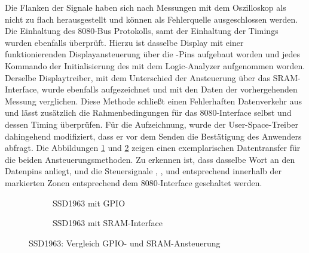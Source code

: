 Die Flanken der Signale haben sich nach Messungen mit dem Oszilloskop als nicht zu flach herausgestellt und können als Fehlerquelle ausgeschlossen werden. Die Einhaltung des 8080-Bus Protokolls, samt der Einhaltung der Timings wurden ebenfalls überprüft. Hierzu ist dasselbe Display mit einer funktionierenden Displayansteuerung über die -Pins aufgebaut worden und jedes Kommando der Initialisierung des  mit dem Logic-Analyzer aufgenommen worden. Derselbe Displaytreiber, mit dem Unterschied der Ansteuerung über das SRAM-Interface, wurde ebenfalls aufgezeichnet und mit den Daten der vorhergehenden Messung verglichen. Diese Methode schließt einen Fehlerhaften Datenverkehr aus und lässt zusätzlich die Rahmenbedingungen für das 8080-Interface selbst und dessen Timing überprüfen. Für die Aufzeichnung, wurde der User-Space-Treiber dahingehend modifiziert, dass er vor dem Senden die Bestätigung des Anwenders abfragt. Die Abbildungen \ref{fig:ssd1963_gpio} und \ref{fig:ssd1963_sram} zeigen einen exemplarischen Datentransfer für die beiden Ansteuerungsmethoden. Zu erkennen ist, dass dasselbe Wort an den Datenpins  anliegt, und die Steuersignale , ,  und  entsprechend innerhalb der markierten Zonen entsprechend dem 8080-Interface geschaltet werden. 

\begin{figure}[htp]
        \begin{center}
        \begin{subfigure}[htp]{1\textwidth}
			\centering
	\caption{SSD1963 mit GPIO}
			\label{fig:ssd1963_gpio}
		\end{subfigure}


        \begin{subfigure}[htp]{1\textwidth}
	\centering
{}
	\caption{SSD1963 mit SRAM-Interface}
	\label{fig:ssd1963_sram}
\end{subfigure}

		\end{center}
\caption{SSD1963: Vergleich GPIO- und SRAM-Ansteuerung}
	\label{fig:ssd1963_gpio_sram}
\end{figure}

